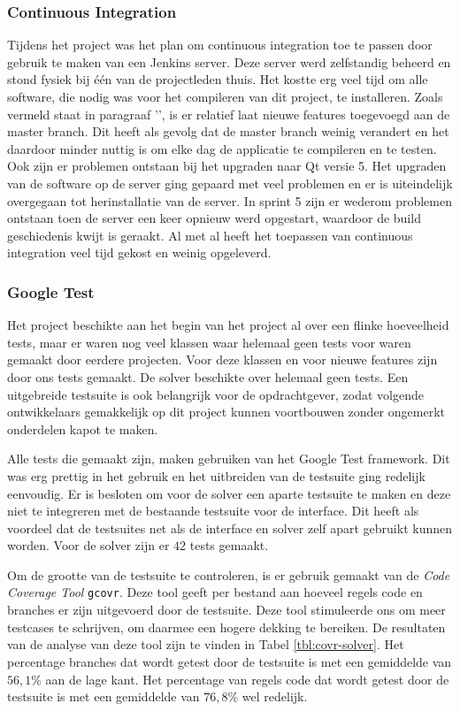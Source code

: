 \subsubsection{Continuous Integration}
Tijdens het project was het plan om continuous integration toe te passen door gebruik te maken van een Jenkins server. Deze server werd zelfstandig beheerd en stond fysiek bij \'e\'en van de projectleden thuis. Het kostte erg veel tijd om alle software, die nodig was voor het compileren van dit project, te installeren. Zoals vermeld staat in paragraaf '', is er relatief laat nieuwe features toegevoegd aan de master branch. Dit heeft als gevolg dat de master branch weinig verandert en het daardoor minder nuttig is om elke dag de applicatie te compileren en te testen. Ook zijn er problemen ontstaan bij het upgraden naar Qt versie 5. Het upgraden van de software op de server ging gepaard met veel problemen en er is uiteindelijk overgegaan tot herinstallatie van de server. In sprint 5 zijn er wederom problemen ontstaan toen de server een keer opnieuw werd opgestart, waardoor de build geschiedenis kwijt is geraakt. Al met al heeft het toepassen van continuous integration veel tijd gekost en weinig opgeleverd. 

\subsubsection{Google Test}
Het project beschikte aan het begin van het project al over een flinke hoeveelheid tests, maar er waren nog veel klassen waar helemaal geen tests voor waren gemaakt door eerdere projecten. Voor deze klassen en voor nieuwe features zijn door ons tests gemaakt. De solver beschikte over helemaal geen tests. Een uitgebreide testsuite is ook belangrijk voor de opdrachtgever, zodat volgende ontwikkelaars gemakkelijk op dit project kunnen voortbouwen zonder ongemerkt onderdelen kapot te maken. 

Alle tests die gemaakt zijn, maken gebruiken van het Google Test framework. Dit was erg prettig in het gebruik en het uitbreiden van de testsuite ging redelijk eenvoudig. Er is besloten om voor de solver een aparte testsuite te maken en deze niet te integreren met de bestaande testsuite voor de interface. Dit heeft als voordeel dat de testsuites net als de interface en solver zelf apart gebruikt kunnen worden. Voor de solver zijn er $42$ tests gemaakt. 

Om de grootte van de testsuite te controleren, is er gebruik gemaakt van de \emph{Code Coverage Tool} \texttt{gcovr}. Deze tool geeft per bestand aan hoeveel regels code en branches er zijn uitgevoerd door de testsuite. Deze tool stimuleerde ons om meer testcases te schrijven, om daarmee een hogere dekking te bereiken. De resultaten van de analyse van deze tool zijn te vinden in Tabel \ref{tbl:covr-solver}. Het percentage branches dat wordt getest door de testsuite is met een gemiddelde van $56,1\%$ aan de lage kant. Het percentage van regels code dat wordt getest door de testsuite is met een gemiddelde van $76,8\%$ wel redelijk.

